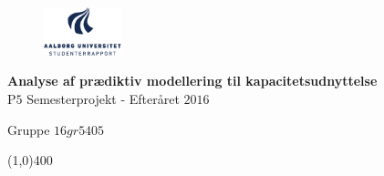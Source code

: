 \clearpage
\thispagestyle{empty}

\begin{figure}[H]
	\raggedleft
		\includegraphics[width=0.2\textwidth]{figures/aaulogo-da.png}
\end{figure} 
\vspace*{\fill} 
\begin{center}	
\begin{Huge}
\textbf{Analyse af prædiktiv modellering til kapacitetsudnyttelse}\\
\vspace{5 mm}
P$5$ Semesterprojekt - Efteråret $2016$\\
\vspace{3 mm}
\end{Huge}
{\Large Gruppe $16gr5405$}
\end{center}
\vspace*{\fill}

\begin{center}
\line(1,0){400}
\end{center}
